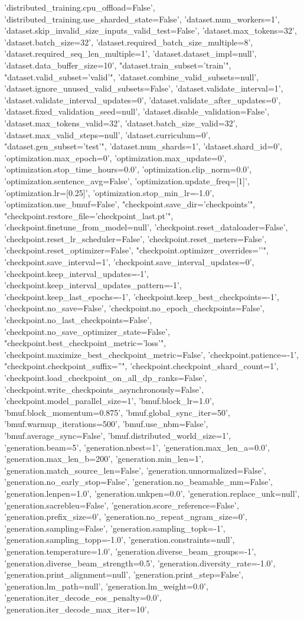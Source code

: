 {{{{{{{{{{{{'distributed_training.cpu_offload=False', 'distributed_training.use_sharded_state=False', 'dataset.num_workers=1', 'dataset.skip_invalid_size_inputs_valid_test=False', 'dataset.max_tokens=32', 'dataset.batch_size=32', 'dataset.required_batch_size_multiple=8', 'dataset.required_seq_len_multiple=1', 'dataset.dataset_impl=null', 'dataset.data_buffer_size=10', "dataset.train_subset='train'", "dataset.valid_subset='valid'", 'dataset.combine_valid_subsets=null', 'dataset.ignore_unused_valid_subsets=False', 'dataset.validate_interval=1', 'dataset.validate_interval_updates=0', 'dataset.validate_after_updates=0', 'dataset.fixed_validation_seed=null', 'dataset.disable_validation=False', 'dataset.max_tokens_valid=32', 'dataset.batch_size_valid=32', 'dataset.max_valid_steps=null', 'dataset.curriculum=0', "dataset.gen_subset='test'", 'dataset.num_shards=1', 'dataset.shard_id=0', 'optimization.max_epoch=0', 'optimization.max_update=0', 'optimization.stop_time_hours=0.0', 'optimization.clip_norm=0.0', 'optimization.sentence_avg=False', 'optimization.update_freq=[1]', 'optimization.lr=[0.25]', 'optimization.stop_min_lr=-1.0', 'optimization.use_bmuf=False', "checkpoint.save_dir='checkpoints'", "checkpoint.restore_file='checkpoint_last.pt'", 'checkpoint.finetune_from_model=null', 'checkpoint.reset_dataloader=False', 'checkpoint.reset_lr_scheduler=False', 'checkpoint.reset_meters=False', 'checkpoint.reset_optimizer=False', "checkpoint.optimizer_overrides='{}'", 'checkpoint.save_interval=1', 'checkpoint.save_interval_updates=0', 'checkpoint.keep_interval_updates=-1', 'checkpoint.keep_interval_updates_pattern=-1', 'checkpoint.keep_last_epochs=-1', 'checkpoint.keep_best_checkpoints=-1', 'checkpoint.no_save=False', 'checkpoint.no_epoch_checkpoints=False', 'checkpoint.no_last_checkpoints=False', 'checkpoint.no_save_optimizer_state=False', "checkpoint.best_checkpoint_metric='loss'", 'checkpoint.maximize_best_checkpoint_metric=False', 'checkpoint.patience=-1', "checkpoint.checkpoint_suffix=''", 'checkpoint.checkpoint_shard_count=1', 'checkpoint.load_checkpoint_on_all_dp_ranks=False', 'checkpoint.write_checkpoints_asynchronously=False', 'checkpoint.model_parallel_size=1', 'bmuf.block_lr=1.0', 'bmuf.block_momentum=0.875', 'bmuf.global_sync_iter=50', 'bmuf.warmup_iterations=500', 'bmuf.use_nbm=False', 'bmuf.average_sync=False', 'bmuf.distributed_world_size=1', 'generation.beam=5', 'generation.nbest=1', 'generation.max_len_a=0.0', 'generation.max_len_b=200', 'generation.min_len=1', 'generation.match_source_len=False', 'generation.unnormalized=False', 'generation.no_early_stop=False', 'generation.no_beamable_mm=False', 'generation.lenpen=1.0', 'generation.unkpen=0.0', 'generation.replace_unk=null', 'generation.sacrebleu=False', 'generation.score_reference=False', 'generation.prefix_size=0', 'generation.no_repeat_ngram_size=0', 'generation.sampling=False', 'generation.sampling_topk=-1', 'generation.sampling_topp=-1.0', 'generation.constraints=null', 'generation.temperature=1.0', 'generation.diverse_beam_groups=-1', 'generation.diverse_beam_strength=0.5', 'generation.diversity_rate=-1.0', 'generation.print_alignment=null', 'generation.print_step=False', 'generation.lm_path=null', 'generation.lm_weight=0.0', 'generation.iter_decode_eos_penalty=0.0', 'generation.iter_decode_max_iter=10', }}}}}}}}}}}}
